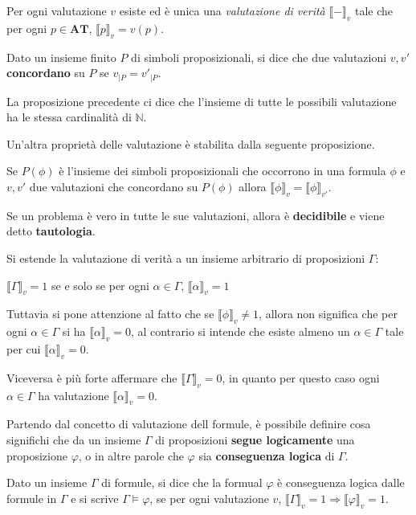 \documentclass[a4paper, 12pt]{book}
\newcommand{\definizione}[2]{%
\vspace{15pt}%
\begin{tcolorbox}[
  colback=cyan!5!white,
  colframe=blue!50!black,
  title=\textbf{Definizione: #1}, %
  coltitle=white,
  fonttitle=\bfseries,
  arc=3mm,
  boxrule=0.5pt,
  enhanced,
  breakable
]
#2 %
\end{tcolorbox}
\vspace{15pt}%
}
\newcommand{\proposizione}[1]{%
\vspace{15pt}%
\begin{tcolorbox}[
  colback=cyan!5!white,
  colframe=blue!50!black,
  title=\textbf{Proposizione}, %
  coltitle=white,
  fonttitle=\bfseries,
  arc=3mm,
  boxrule=0.5pt,
  enhanced,
  breakable
]
#1 %
\end{tcolorbox}
\vspace{15pt}%
}
\begin{document}
  \proposizione{Per ogni valutazione $v$ esiste ed è unica una \textit{valutazione di verità} ${\llbracket - \rrbracket}_v$ tale che per ogni $p \in \mathbf{AT}$, ${\llbracket p \rrbracket}_v = v(p)$.
  }

  \definizione{concordanza}{  Dato un insieme finito $P$ di simboli proposizionali, si dice che due valutazioni $v, v'$ \textbf{concordano} su $P$ se $v_{|P} = v'_{|P}$. 
  }

  La proposizione precedente ci dice che l'insieme di tutte le possibili valutazione ha le stessa cardinalità di $\mathbb{N}$.

  Un'altra proprietà delle valutazione è stabilita dalla seguente proposizione.

  \proposizione{Se $P(\phi)$ è l'insieme dei simboli proposizionali che occorrono in una formula $\phi$ e $v, v'$ due valutazioni che concordano su $P(\phi)$ allora ${\llbracket \phi \rrbracket}_v = {\llbracket \phi \rrbracket}_{v'}$.
  }

  Se un problema è vero in tutte le sue valutazioni, allora è \textbf{decidibile} e viene detto \textbf{tautologia}.

  Si estende la valutazione di verità a un insieme arbitrario di proposizioni $\Gamma$: \par
  \begin{center}
      ${\llbracket \Gamma \rrbracket}_v = 1$ se e solo se per ogni $\alpha \in \Gamma$, ${\llbracket \alpha \rrbracket}_v = 1$
  \end{center}

  Tuttavia si pone attenzione al fatto che se ${\llbracket \phi \rrbracket}_v \neq 1$, allora non significa che per ogni $\alpha \in \Gamma$ si ha ${\llbracket \alpha \rrbracket}_v = 0$, al contrario si intende che esiste almeno un $\alpha \in \Gamma$ tale per cui ${\llbracket \alpha \rrbracket}_v = 0$.

  Viceversa è più forte affermare che ${\llbracket \Gamma \rrbracket}_v = 0$, in quanto per questo caso ogni $\alpha \in \Gamma$ ha valutazione ${\llbracket \alpha \rrbracket}_v = 0$.

  Partendo dal concetto di valutazione dell formule, è possibile definire cosa significhi che da un insieme $\Gamma$ di proposizioni \textbf{segue logicamente} una proposizione $\varphi$, o in altre parole che $\varphi$ sia \textbf{conseguenza logica} di $\Gamma$.

  \definizione{conseguenza logica}{Dato un insieme $\Gamma$ di formule, si dice che la formual $\varphi$ è conseguenza logica dalle formule in $\Gamma$ e si scrive $\Gamma \models \varphi$, se per ogni valutazione $v$, ${\llbracket \Gamma \rrbracket}_v = 1 \Rightarrow {\llbracket \varphi \rrbracket}_v = 1$.
  }
\end{document}
